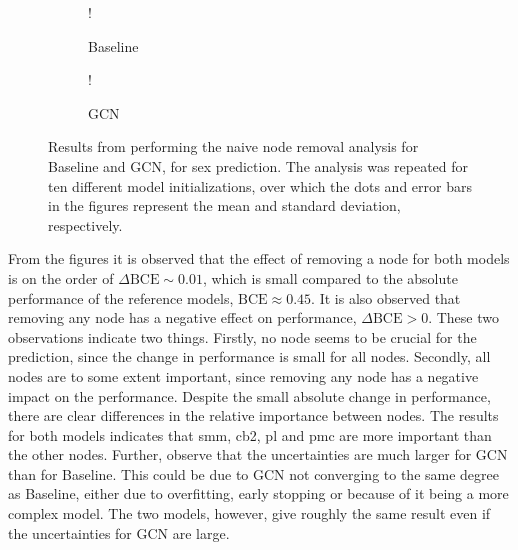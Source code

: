 \begin{figure}[!htbp]
    \centering
        \begin{subfigure}{.5\textwidth}
            \centering
            \begin{center}
                \resizebox {1.0\linewidth} {!} {
                    
                }
            \end{center}
            \caption{Baseline}
            \label{fig:naive_sex_baseline}
        \end{subfigure}%
        \begin{subfigure}{.5\textwidth}
            \centering
            \begin{center}
                \resizebox {1.0\linewidth} {!} {
                    
                }
            \end{center}
            \caption{GCN}
            \label{fig:naive_sex_gcn}
        \end{subfigure}
    \caption{Results from performing the naive node removal analysis for Baseline and GCN, for sex prediction. The analysis was repeated for ten different model initializations, over which the dots and error bars in the figures represent the mean and standard deviation, respectively.}
    \label{fig:naive_sex}
\end{figure}


From the figures it is observed that the effect of removing a node for both models is on the order of $\Delta \text{BCE} \sim 0.01$, which is small compared to the absolute performance of the reference models, $\text{BCE} \approx 0.45$. It is also observed that removing any node has a negative effect on performance, $\Delta\text{BCE}>0$. These two observations indicate two things. Firstly, no node seems to be crucial for the prediction, since the change in performance is small for all nodes. Secondly, all nodes are to some extent important, since removing any node has a negative impact on the performance. Despite the small absolute change in performance, there are clear differences in the relative importance between nodes. The results for both models indicates that \acrshort{smm}, \acrshort{cb2}, \acrshort{pl} and \acrshort{pmc} are more important than the other nodes. Further, observe that the uncertainties are much larger for GCN than for Baseline. This could be due to GCN not converging to the same degree as Baseline, either due to overfitting, early stopping or because of it being a more complex model. The two models, however, give roughly the same result even if the uncertainties for GCN are large. 

